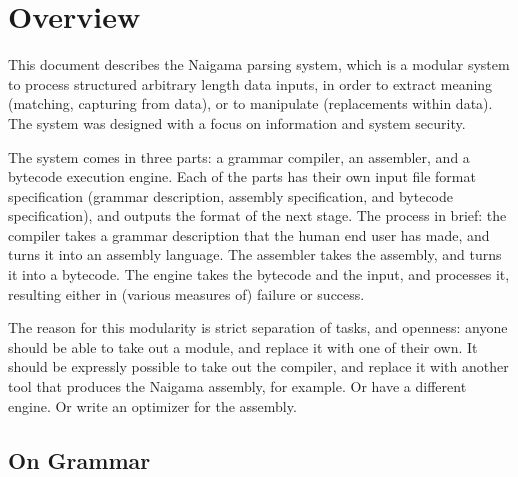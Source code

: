 \section{Overview}

This document describes the Naigama parsing system, which is a 
modular system to process structured arbitrary length data inputs,
in order to extract meaning (matching, capturing from data), or to
manipulate (replacements within data).
The system was designed with a focus on information and system security.

The system comes in three parts: a grammar compiler, an assembler,
and a bytecode execution engine. Each of the parts has their own
input file format specification (grammar description, assembly specification,
and bytecode specification), and outputs the format of the next stage.
The process in brief: the compiler takes a
grammar description that the human end user has made, and turns it into
an assembly language. The assembler takes the assembly, and turns it
into a bytecode. The engine takes the bytecode and the input, and
processes it, resulting either in (various measures of) failure or
success.




The reason for this modularity is strict separation of tasks, and openness:
anyone should be able to take out a module, and replace it with one
of their own.
It should be expressly possible to take out the compiler, and replace
it with another tool that produces the Naigama assembly, for example.
Or have a different engine. Or write an optimizer for the assembly.

\subsection{On Grammar}
  
